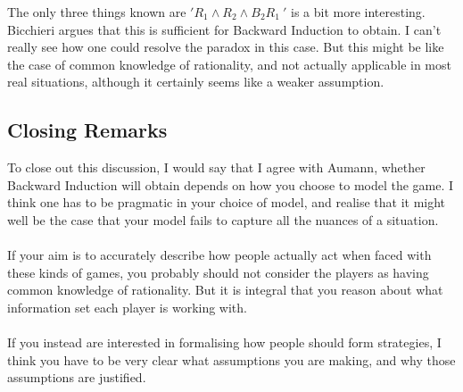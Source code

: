 \documentclass{article}
\begin{document}
The only three things known are $'R_{1}\wedge R_{2}\wedge B_{2}R_{1}\ '$ is a bit more interesting. Bicchieri argues that this is sufficient for Backward Induction to obtain. I can't really see how one could resolve the paradox in this case. But this might be like the case of common knowledge of rationality, and not actually applicable in most real situations, although it certainly seems like a weaker assumption.

\subsection{Closing Remarks} 

To close out this discussion, I would say that I agree with Aumann, whether Backward Induction will obtain depends on how you choose to model the game. I think one has to be pragmatic in your choice of model, and realise that it might well be the case that your model fails to capture all the nuances of a situation.
\\
\\
If your aim is to accurately describe how people actually act when faced with these kinds of games, you probably should not consider the players as having common knowledge of rationality. But it is integral that you reason about what information set each player is working with.
\\
\\
If you instead are interested in formalising how people should form strategies, I think you have to be very clear what assumptions you are making, and why those assumptions are justified.
\end{document}

